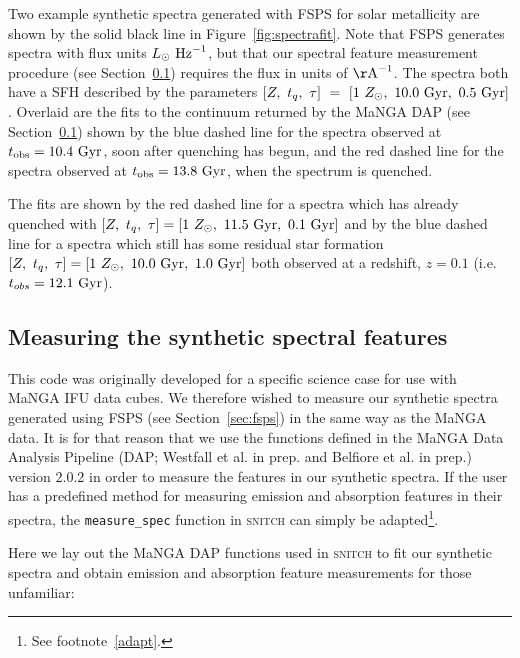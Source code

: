 \documentclass[useAMS,usenatbib]{mn2e}
\begin{document}
Two example synthetic spectra generated with FSPS for solar metallicity are shown by the solid black line in Figure~\ref{fig:spectrafit}. Note that FSPS generates spectra with flux units $L_{\odot}~\rm{Hz}^{-1}$, but that our spectral feature measurement procedure (see Section~\ref{sec:dap}) requires the flux in units of $\rm{\AA}^{-1}$. The spectra both have a SFH described by the parameters $[Z,~t_q,~\tau]~=~[1~Z_{\odot},~10.0~\rm{Gyr},~0.5~\rm{Gyr}]$. Overlaid are the fits to the continuum returned by the MaNGA DAP (see Section~\ref{sec:dap}) shown by the blue dashed line for the spectra observed at $t_{\rm{obs}} = 10.4~\rm{Gyr}$, soon after quenching has begun, and the red dashed line for the spectra observed at $t_{\rm{obs}} = 13.8~\rm{Gyr}$, when the spectrum is quenched.

 The fits are shown by the red dashed line for a spectra which has already quenched with $[Z,~t_q,~\tau] = [1~Z_{\odot},~11.5~\rm{Gyr},~0.1~\rm{Gyr}]$ and by the blue dashed line for a spectra which still has some residual star formation $[Z,~t_q,~\tau] = [1~Z_{\odot},~10.0~\rm{Gyr},~1.0~\rm{Gyr}]$ both observed at a redshift, $z=0.1$ (i.e. $t_{obs}=12.1~\rm{Gyr}$). 


\subsection{Measuring the synthetic spectral features}\label{sec:dap}

This code was originally developed for a specific science case for use with MaNGA IFU data cubes. We therefore wished to measure our synthetic spectra generated using FSPS (see Section~\ref{sec:fsps}) in the same way as the MaNGA data. It is for that reason that we use the functions defined in the MaNGA Data Analysis Pipeline (DAP; Westfall et al. in prep. and Belfiore et al. in prep.) version $2.0.2$ in order to measure the features in our synthetic spectra. If the user has a predefined method for measuring emission and absorption features in their spectra, the \texttt{measure\_spec} function in \textsc{snitch} can simply be adapted\footnote{See footnote~\ref{adapt}.}.

Here we lay out the MaNGA DAP functions used in \textsc{snitch} to fit our synthetic spectra and obtain emission and absorption feature measurements for those unfamiliar:
\end{document}
